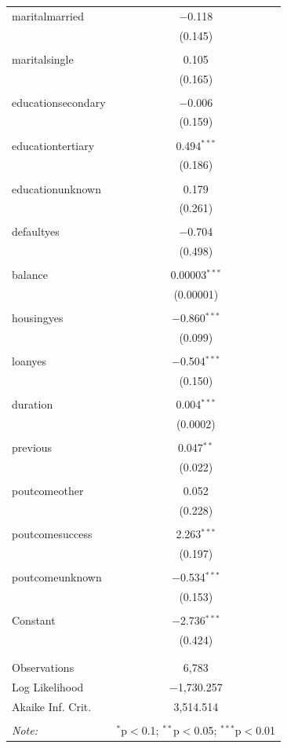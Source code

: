 \documentclass[11pt]{article}
\begin{document}
{\begin{longtable}{@{\extracolsep{5pt}}lc}
 maritalmarried & $-$0.118 \\ 
  & (0.145) \\ 
  & \\ 
 maritalsingle & 0.105 \\ 
  & (0.165) \\ 
  & \\ 
 educationsecondary & $-$0.006 \\ 
  & (0.159) \\ 
  & \\ 
 educationtertiary & 0.494$^{***}$ \\ 
  & (0.186) \\ 
  & \\ 
 educationunknown & 0.179 \\ 
  & (0.261) \\ 
  & \\ 
 defaultyes & $-$0.704 \\ 
  & (0.498) \\ 
  & \\ 
 balance & 0.00003$^{***}$ \\ 
  & (0.00001) \\ 
  & \\ 
 housingyes & $-$0.860$^{***}$ \\ 
  & (0.099) \\ 
  & \\ 
 loanyes & $-$0.504$^{***}$ \\ 
  & (0.150) \\ 
  & \\ 
 duration & 0.004$^{***}$ \\ 
  & (0.0002) \\ 
  & \\ 
 previous & 0.047$^{**}$ \\ 
  & (0.022) \\ 
  & \\ 
 poutcomeother & 0.052 \\ 
  & (0.228) \\ 
  & \\ 
 poutcomesuccess & 2.263$^{***}$ \\ 
  & (0.197) \\ 
  & \\ 
 poutcomeunknown & $-$0.534$^{***}$ \\ 
  & (0.153) \\ 
  & \\ 
 Constant & $-$2.736$^{***}$ \\ 
  & (0.424) \\ 
  & \\ 
\hline \\[-1.8ex] 
Observations & 6,783 \\ 
Log Likelihood & $-$1,730.257 \\ 
Akaike Inf. Crit. & 3,514.514 \\ 
\hline 
\hline \\[-1.8ex] 
\textit{Note:}  & \multicolumn{1}{r}{$^{*}$p$<$0.1; $^{**}$p$<$0.05; $^{***}$p$<$0.01} \\ 
\end{longtable} 

}
\end{document}
